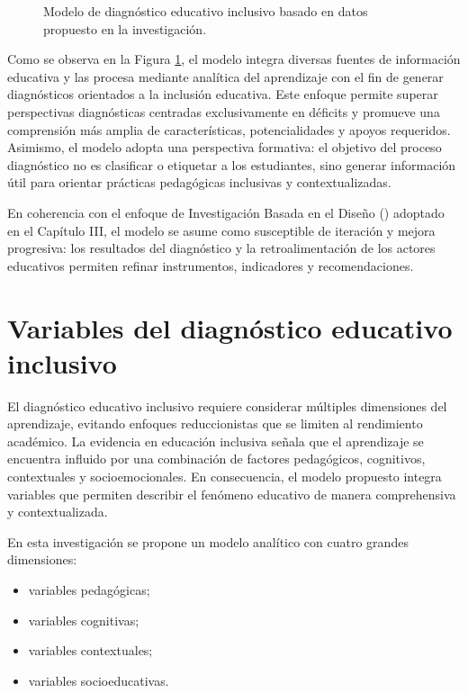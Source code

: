 \begin{refsection}
\begin{figure}[htbp]
{\begin{tikzpicture}
\end{tikzpicture}
}
\caption{Modelo de diagnóstico educativo inclusivo basado en datos propuesto en la investigación.}
\label{fig:modelo-diagnostico}
\end{figure}

Como se observa en la Figura \ref{fig:modelo-diagnostico}, el modelo integra diversas fuentes de información educativa y las procesa mediante analítica del aprendizaje con el fin de generar diagnósticos orientados a la inclusión educativa. Este enfoque permite superar perspectivas diagnósticas centradas exclusivamente en déficits y promueve una comprensión más amplia de características, potencialidades y apoyos requeridos. Asimismo, el modelo adopta una perspectiva formativa: el objetivo del proceso diagnóstico no es clasificar o etiquetar a los estudiantes, sino generar información útil para orientar prácticas pedagógicas inclusivas y contextualizadas.

En coherencia con el enfoque de Investigación Basada en el Diseño (\DBR) adoptado en el Capítulo III, el modelo se asume como susceptible de iteración y mejora progresiva: los resultados del diagnóstico y la retroalimentación de los actores educativos permiten refinar instrumentos, indicadores y recomendaciones.

\section{Variables del diagnóstico educativo inclusivo}

El diagnóstico educativo inclusivo requiere considerar múltiples dimensiones del aprendizaje, evitando enfoques reduccionistas que se limiten al rendimiento académico. La evidencia en educación inclusiva señala que el aprendizaje se encuentra influido por una combinación de factores pedagógicos, cognitivos, contextuales y socioemocionales. En consecuencia, el modelo propuesto integra variables que permiten describir el fenómeno educativo de manera comprehensiva y contextualizada.

En esta investigación se propone un modelo analítico con cuatro grandes dimensiones:

\begin{itemize}
\item variables pedagógicas;
\item variables cognitivas;
\item variables contextuales;
\item variables socioeducativas.
\end{itemize}


\end{refsection}

